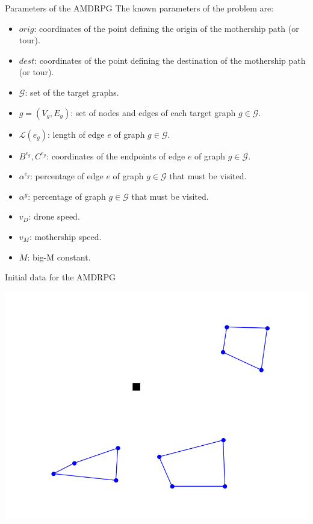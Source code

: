 \documentclass[slidestop,usepdftitle=false,10pt]{beamer}
\begin{document}
	\begin{frame}{Parameters of the AMDRPG}
	The known parameters of the problem are:
	\begin{itemize}
	    \item $orig$: coordinates of the point defining the origin of the mothership path (or tour).
        \item $dest$: coordinates of the point defining the destination of the mothership path (or tour).
        \item $\mathcal{G}$: set of the target graphs.\\
        \item $g = (V_g, E_g)$: set of nodes and edges of each target graph $g \in \mathcal{G}$.
        \item $\mathcal{L}(e_g)$: length of edge $e$ of graph $g \in \mathcal{G}$.
        \item $B^{e_g}, C^{e_g}$: coordinates of the endpoints of edge $e$ of graph $g \in \mathcal{G}$.
        \item $\alpha^{e_g}$: percentage of edge $e$ of graph $g \in \mathcal{G}$ that must be visited.
        \item $\alpha^g$: percentage of graph $g \in \mathcal{G}$ that must be visited.
        \item $v_D$: drone speed.
        \item $v_M$: mothership speed.
        \item $M$: big-M constant.
    \end{itemize}
	\end{frame}
	
	\begin{frame}{Initial data for the AMDRPG}
	    \begin{center}
			\includegraphics[width=0.7\linewidth]{PDMTZ_1}
		\end{center}
	\end{frame}
	
\end{document}
